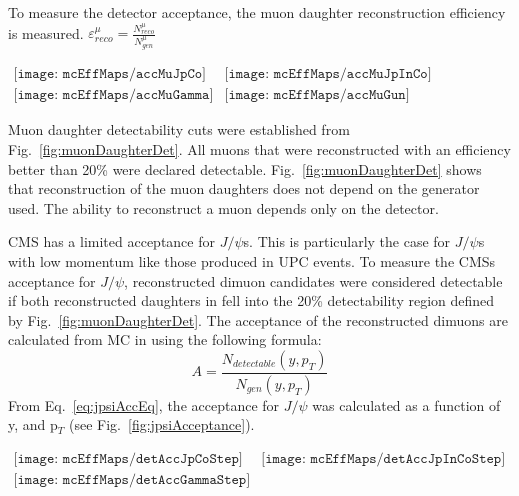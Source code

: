       To measure the detector acceptance, the muon daughter reconstruction 
        efficiency is measured.
        $\varepsilon^{\mu}_{reco} = \frac{N^{\mu}_{reco}}{N^{\mu}_{gen}}$
        \begin{figure*}[!Hhtb]
          \centering
          $ \begin{array}{cc}
            \texttt{[image: mcEffMaps/accMuJpCo]} &
            \texttt{[image: mcEffMaps/accMuJpInCo]} \\
            \texttt{[image: mcEffMaps/accMuGamma]} &
            \texttt{[image: mcEffMaps/accMuGun]}
          \end{array} $
          \caption{ Muon daughter detectability from coherent J/$\psi$, 
            incoherent J/$\psi$, photon-photon, and J/$\psi$ gun samples.}
          \label{fig:muonDaughterDet}
        \end{figure*}
      Muon daughter detectability cuts were established from 
        Fig.~\ref{fig:muonDaughterDet}.
      All muons that were reconstructed with an efficiency better than 20\% 
        were declared detectable.
      Fig.~\ref{fig:muonDaughterDet} shows that reconstruction of the muon 
        daughters does not depend on the generator used.
      The ability to reconstruct a muon depends only on the detector. 

      CMS has a limited acceptance for $J/\psi$s. 
      This is particularly the case for $J/\psi$s with low momentum like those
        produced in UPC events. 
      To measure the CMSs acceptance for $J/\psi$, reconstructed dimuon 
        candidates were considered detectable if both reconstructed daughters 
        in fell into the 20\% detectability region defined by 
        Fig.~\ref{fig:muonDaughterDet}.
      The acceptance of the reconstructed dimuons are calculated from MC in 
        using the following formula:
      \begin{equation}
        A=\frac{N_{detectable}(y,p_{T})}{N_{gen}(y,p_{T})}
        \label{eq:jpsiAccEq}
      \end{equation}
      From Eq.~\ref{eq:jpsiAccEq}, the acceptance for $J/\psi$ was calculated
        as a function of y, and p$_{T}$ (see Fig.~\ref{fig:jpsiAcceptance}).
        \begin{figure*}[!Hhtb]
          \centering
          $ \begin{array}{cc}
            \texttt{[image: mcEffMaps/detAccJpCoStep]} &
            \texttt{[image: mcEffMaps/detAccJpInCoStep]} \\
            \texttt{[image: mcEffMaps/detAccGammaStep]}
          \end{array} $
          \caption{Dimuon acceptance from coherent J/$\psi$ (top left), incoherent 
            J$\psi$ (top right), and photon-photon interactions (lower).}
          \label{fig:jpsiAcceptance}
        \end{figure*}

